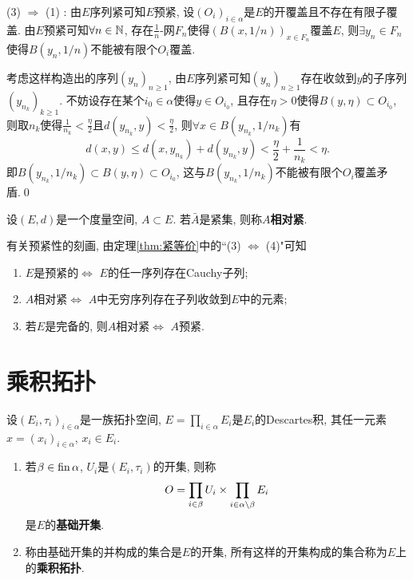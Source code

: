 \begin{Proof}
     (3) $ \Rightarrow $ (1) : 由$ E $序列紧可知$ E $预紧, 设$ (O_i)_{i\in\alpha} $是$ E $的开覆盖且不存在有限子覆盖. 由$ E $预紧可知$ \forall n\in\mathbb{N} $, 存在$ \frac{1}{n} $-网$ F_n $使得$ (B(x,1/n))_{x\in F_n} $覆盖$ E $, 则$ \exists y_n\in F_n $使得$ B(y_n,1/n) $不能被有限个$ O_i $覆盖.
     
     考虑这样构造出的序列$ (y_n)_{n\geqslant 1} $, 由$ E $序列紧可知$ (y_n)_{n\geqslant 1} $存在收敛到$ y $的子序列$ (y_{n_k})_{k\geqslant 1} $. 不妨设存在某个$ i_0\in\alpha $使得$ y\in O_{i_0} $, 且存在$ \eta>0 $使得$ B(y,\eta)\subset O_{i_0} $, 则取$ n_k $使得$ \frac{1}{n_k}<\frac{\eta}{2} $且$ d(y_{n_k},y)<\frac{\eta}{2} $, 则$ \forall x\in B(y_{n_k},1/n_k) $有
     \[
     d(x,y)\leqslant d(x,y_{n_k})+d(y_{n_k},y)<\frac{\eta}{2}+\frac{1}{n_k}<\eta.
     \]
     即$ B(y_{n_k},1/n_k)\subset B(y,\eta)\subset O_{i_0} $, 这与$ B(y_{n_k},1/n_k) $不能被有限个$ O_i $覆盖矛盾.\qed
     \end{Proof}
     
     \begin{Definition}[相对紧]\label{def:相对紧}
     设$ (E,d) $是一个度量空间, $ A\subset E $. 若$ \bar{A} $是紧集, 则称$ A $\textbf{相对紧}.
     \end{Definition}
     
     \begin{Remark}
     有关预紧性的刻画, 由定理\ref{thm:紧等价}中的``(3) $ \Leftrightarrow $ (4)"可知
     \begin{enumerate}[(1)]
     \item $ E $是预紧的$ \Longleftrightarrow $ $ E $的任一序列存在Cauchy子列;
     
     \item $ A $相对紧$ \Longleftrightarrow $ $ A $中无穷序列存在子列收敛到$ E $中的元素;
     
     \item 若$ E $是完备的, 则$ A $相对紧$ \Longleftrightarrow $ $ A $预紧.
     \end{enumerate}
     \end{Remark}
     
\section{乘积拓扑}
	
	\begin{Definition}[乘积拓扑]\label{def:乘积拓扑}
	设$ (E_i,\tau_i)_{i\in\alpha} $是一族拓扑空间, $ E=\prod\limits_{i\in\alpha}E_i $是$ E_i $的Descartes积, 其任一元素$ x=(x_i)_{i\in\alpha} $, $ x_i\in E_i $.
	\begin{enumerate}[(1)]
	\item 若$ \beta\in\operatorname{fin}\alpha $, $ U_i $是$ (E_i,\tau_i) $的开集, 则称
	\[
	O=\prod_{i\in\beta}U_i\times\prod_{i\in\alpha\setminus\beta}E_i
	\]
	是$ E $的\textbf{基础开集}.
	
	\item\label{item:乘积拓扑任意并} 称由基础开集的并构成的集合是$ E $的开集, 所有这样的开集构成的集合称为$ E $上的\textbf{乘积拓扑}.
	\end{enumerate}
	\end{Definition}
	
